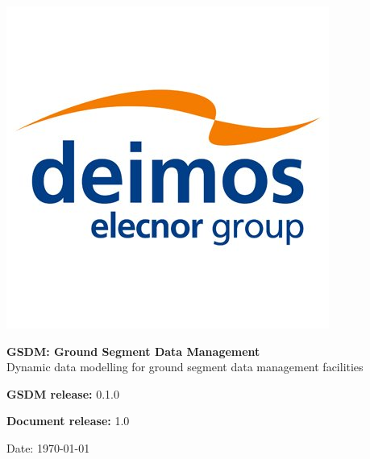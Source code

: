 %
%
%

\begin{titlepage}
	
    \includegraphics[scale=0.20]{../fig/deimos_logo.jpg}
    
    \vspace{2.0cm}
    
    	\begin{center}
    
    \vspace{2cm}
    
    \LARGE{\textbf{GSDM: Ground Segment Data Management}} \\    
    \LARGE{Dynamic data modelling for ground segment data management facilities}
    
    	\end{center}    
    
    \vspace{7.0cm}

    \vspace{0.5cm}

    \Large{\textbf{GSDM release:} 0.1.0}

    \Large{\textbf{Document release:} 1.0}

    \vspace{1cm}
    
    \large{Date: \today}
    
\end{titlepage}

